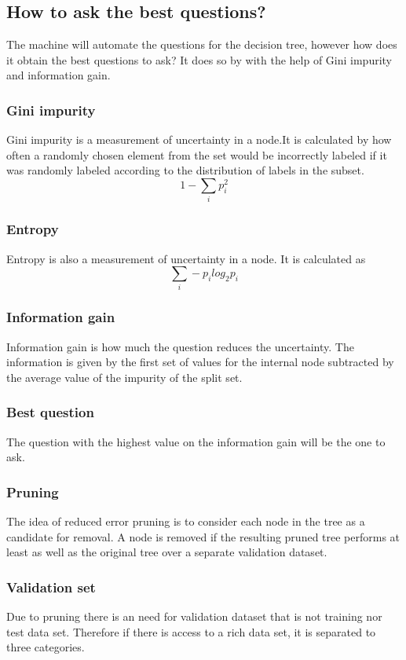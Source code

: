 \documentclass[12pt]{article}
\numberwithin{equation}{section}
\begin{document}
\subsection{How to ask the best questions?}
The machine will automate the questions for the decision tree, however how does it obtain the best questions to ask? It does so by with the help of Gini impurity and information gain.
\subsubsection{Gini impurity}
Gini impurity is a measurement of uncertainty in a node.It is calculated by how often a randomly chosen element from the set would be incorrectly labeled if it was randomly labeled according to the distribution of labels in the subset. 
\begin{equation}
    1 - \sum_i p_i^2
\end{equation}
\subsubsection{Entropy}
Entropy is also a measurement of uncertainty in a node. It is calculated as
\begin{equation}
    \sum_i -p_ilog_2 p_i
\end{equation}
\subsubsection{Information gain}
Information gain is how much the question reduces the uncertainty. The information is given by the first set of values for the internal node subtracted by the average value of the impurity of the split set. 
\subsubsection{Best question}
The question with the highest value on the information gain will be the one to ask.
\subsubsection{Pruning}
The idea of reduced error pruning is to consider each node in the tree as a candidate for removal. A node is removed if the resulting pruned tree performs at least as well as the original tree over a separate validation dataset.
\subsubsection{Validation set}
Due to pruning there is an need for validation dataset that is not training nor test data set. Therefore if there is access to a rich data set, it is separated to three categories.
\end{document}
